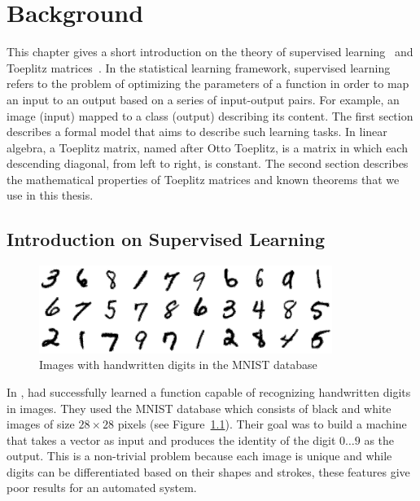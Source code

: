 \chapter{Background}
\label{chapter:ch2-background}
\localtableofcontents
\vspace{\marginbellowtable}


This chapter gives a short introduction on the theory of supervised learning~\cite{shalev2014understanding} and Toeplitz matrices~\cite{gray2006toeplitz}.
In the statistical learning framework, supervised learning refers to the problem of optimizing the parameters of a function in order to map an input to an output based on a series of input-output pairs.
For example, an image (input) mapped to a class (output) describing its content.
The first section describes a formal model that aims to describe such learning tasks.
In linear algebra, a Toeplitz matrix, named after Otto Toeplitz, is a matrix in which each descending diagonal, from left to right, is constant.
The second section describes the mathematical properties of Toeplitz matrices and known theorems that we use in this thesis. 


\section{Introduction on Supervised Learning}
\label{section:ch2-introduction_on_supervised_learning}

\begin{figure}[t]
  \centering
  \includegraphics[width=0.85\textwidth]{figures/main/ch2-background/mnist-dataset.png}
  \caption{Images with handwritten digits in the MNIST database \cite{lecun1998gradient}}
  \label{figure:ch2-mnist-database}
\end{figure}


In \citeyear{lecun1998gradient}, \citeauthor{lecun1998gradient} had successfully learned a function capable of recognizing handwritten digits in images.
They used the MNIST database \cite{lecun1998gradient} which consists of black and white images of size $28 \times 28$ pixels (see Figure~\ref{figure:ch2-mnist-database}).
Their goal was to build a machine that takes a vector as input and produces the identity of the digit $0 \dots 9$ as the output.
This is a non-trivial problem because each image is unique and while digits can be differentiated based on their shapes and strokes, these features give poor results for an automated system. 

